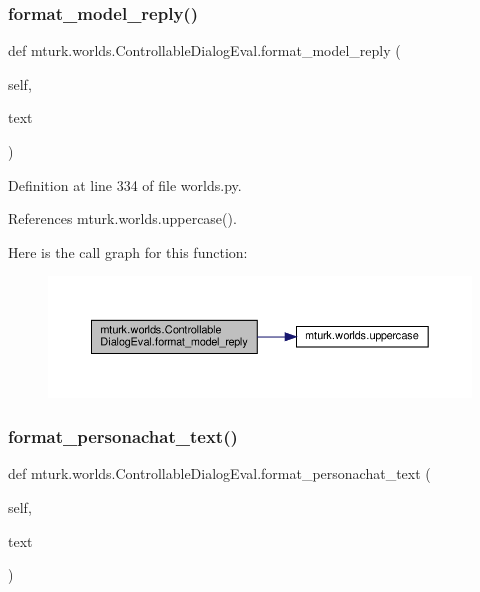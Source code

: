 \subsubsection{\texorpdfstring{format\+\_\+model\+\_\+reply()}{format\_model\_reply()}}
{\footnotesize\ttfamily def mturk.\+worlds.\+Controllable\+Dialog\+Eval.\+format\+\_\+model\+\_\+reply (\begin{DoxyParamCaption}\item[{}]{self,  }\item[{}]{text }\end{DoxyParamCaption})}



Definition at line 334 of file worlds.\+py.



References mturk.\+worlds.\+uppercase().

Here is the call graph for this function\+:
\nopagebreak
\begin{figure}[H]
\begin{center}
\leavevmode
\includegraphics[width=350pt]{classmturk_1_1worlds_1_1ControllableDialogEval_ae1d1a4dcf645ea5776c7a7611f7ce386_cgraph}
\end{center}
\end{figure}
\mbox{\label{classmturk_1_1worlds_1_1ControllableDialogEval_a800e08903e8ad345295c5094bdd0b13b}} 
\subsubsection{\texorpdfstring{format\+\_\+personachat\+\_\+text()}{format\_personachat\_text()}}
{\footnotesize\ttfamily def mturk.\+worlds.\+Controllable\+Dialog\+Eval.\+format\+\_\+personachat\+\_\+text (\begin{DoxyParamCaption}\item[{}]{self,  }\item[{}]{text }\end{DoxyParamCaption})}



